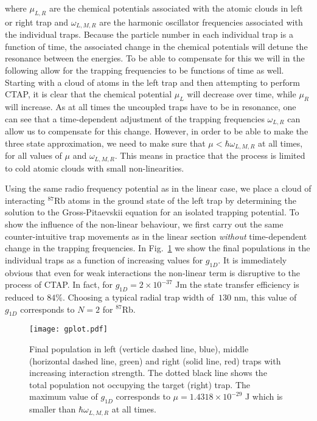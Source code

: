 where $\mu_{L,R}$ are the chemical potentials associated with the
atomic clouds in left or right trap and $\omega_{L,M,R}$ are the
harmonic oscillator frequencies associated with the individual traps.
Because the particle number in each individual trap is a function of
time, the associated change in the chemical potentials will detune the
resonance between the energies. To be able to compensate for this we
will in the following allow for the trapping frequencies to be
functions of time as well.  Starting with a cloud of atoms in the left
trap and then attempting to perform CTAP, it is clear that the
chemical potential $\mu_L$ will decrease over time, while $\mu_R$ will
increase. As at all times the uncoupled traps have to be in resonance,
one can see that a time-dependent adjustment of the trapping
frequencies $\omega_{L,R}$ can allow us to compensate for this
change. However, in order to be able to make the three state
approximation, we need to make sure that $\mu<\hbar\omega_{L,M,R}$ at
all times, for all values of $\mu$ and $\omega_{L,M,R}$. This means in
practice that the process is limited to cold atomic clouds with small
non-linearities.

Using the same radio frequency potential as in the linear case, we
place a cloud of interacting $^{87}$Rb atoms in the ground state of
the left trap by determining the solution to the Gross-Pitaevskii
equation for an isolated trapping potential. To show the influence of
the non-linear behaviour, we first carry out the same
counter-intuitive trap movements as in the linear section {\it
  without} time-dependent change in the trapping frequencies. In
Fig.~\ref{fig:NAFinalPopulationNL} we show the final populations in
the individual traps as a function of increasing values for
$g_{1D}$. It is immediately obvious that even for weak interactions
the non-linear term is disruptive to the process of CTAP. In fact, for
$g_{1D}=2 \times 10^{-37}$ Jm the state transfer efficiency is reduced
to $84\%$. Choosing a typical radial trap width of $~130$ nm, this
value of $g_{1D}$ corresponds to $N=2$ for $^{87}$Rb. 

\begin{figure}[tb]
  \texttt{[image: gplot.pdf]}
  \caption{Final population in left (verticle dashed line, blue),
    middle (horizontal dashed line, green) and right (solid line, red)
    traps with increasing interaction strength. The dotted black line
    shows the total population not occupying the target (right)
    trap. The maximum value of $g_{1D}$ corresponds to $\mu=1.4318
    \times 10^{-29}$ J which is smaller than $\hbar\omega_{L,M,R}$ at
    all times.}
  \label{fig:NAFinalPopulationNL}
\end{figure}

